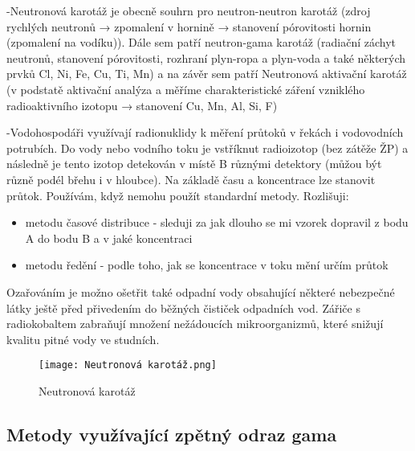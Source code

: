 \begin{itemize}
    -Neutronová karotáž je obecně souhrn pro neutron-neutron karotáž (zdroj rychlých neutronů → zpomalení v hornině → stanovení pórovitosti hornin (zpomalení na vodíku)). Dále sem patří neutron-gama karotáž (radiační záchyt neutronů, stanovení pórovitosti, rozhraní plyn-ropa a plyn-voda a také některých prvků Cl, Ni, Fe, Cu, Ti, Mn) a na závěr sem patří Neutronová aktivační karotáž (v podstatě aktivační analýza a měříme charakteristické záření vzniklého radioaktivního izotopu → stanovení Cu, Mn, Al, Si, F)
    \\

    
\end{itemize}

-Vodohospodáři využívají radionuklidy k měření průtoků v řekách i vodovodních potrubích. Do vody nebo vodního toku je vstříknut radioizotop (bez zátěže ŽP) a následně je tento izotop detekován v místě B různými detektory (můžou být různě podél břehu i v hloubce). Na základě času a koncentrace lze stanovit průtok. Používám, když nemohu použít standardní metody. Rozlišuji:
\begin{itemize}
    \item metodu časové distribuce - sleduji za jak dlouho se mi vzorek dopravil z bodu A do bodu B a v jaké koncentraci
    \item metodu ředění - podle toho, jak se koncentrace v toku mění určím průtok
\end{itemize}
Ozařováním je možno
ošetřit také odpadní vody obsahující některé nebezpečné látky ještě před přivedením do běžných čističek odpadních vod.
Zářiče s radiokobaltem zabraňují množení nežádoucích mikroorganizmů, které snižují kvalitu pitné vody ve studních.


\begin{figure}[ht!]
    \centering
    \texttt{[image: Neutronová karotáž.png]}
    \caption{Neutronová karotáž}
\end{figure}

\subsection{Metody využívající zpětný odraz gama}
